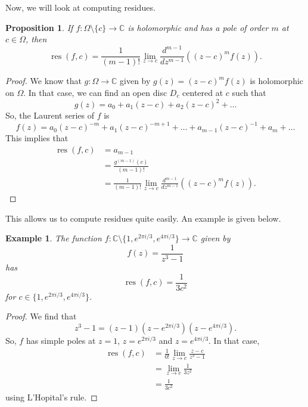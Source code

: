 \documentclass[a4paper, openany]{memoir}
\theoremstyle{definition}
\theoremstyle{plain}
\newtheorem{proposition}[definition]{Proposition}
\newtheorem{example}[definition]{Example}
\begin{document}
Now, we will look at computing residues.
\begin{proposition}
    If $f: \Omega \setminus \{c\} \to \mathbb{C}$ is holomorphic and has a pole of order $m$ at $c \in \Omega$, then
    \[\operatorname{res}(f, c) = \frac{1}{(m-1)!} \lim_{z \to c} \frac{d^{m-1}}{dz^{m-1}} \left((z - c)^m f(z)\right).\]
\end{proposition}
\begin{proof}
    We know that $g: \Omega \to \mathbb{C}$ given by $g(z) = (z - c)^m f(z)$ is holomorphic on $\Omega$. In that case, we can find an open disc $D_c$ centered at $c$ such that
    \[g(z) = a_0 + a_1 (z - c) + a_2 (z - c)^2 + \dots\]
    So, the Laurent series of $f$ is
    \[f(z) = a_0 (z - c)^{-m} + a_1 (z - c)^{-m + 1} + \dots + a_{m-1} (z - c)^{-1} + a_m + \dots\]
    This implies that
    \begin{align*}
        \operatorname{res}(f, c) &= a_{m-1} \\
        &= \frac{g^{(m-1)}(c)}{(m-1)!} \\ %
        &= \frac{1}{(m-1)!} \lim_{z \to c} \frac{d^{m-1}}{dz^{m-1}} \left((z - c)^m f(z) \right). %
    \end{align*}
\end{proof}
\noindent This allows us to compute residues quite easily. An example is given below.
\begin{example}
    The function $f: \mathbb{C} \setminus \{1, e^{2\pi i/3}, e^{4\pi i/3}\} \to \mathbb{C}$ given by
    \[f(z) = \frac{1}{z^3 - 1}\]
    has 
    \[\operatorname{res}(f, c) = \frac{1}{3c^2}\]
    for $c \in \{1, e^{2\pi i/3}, e^{4\pi i/3}\}$.
\end{example}
\begin{proof}
    We find that
    \[z^3 - 1 = (z - 1) (z - e^{2\pi i/3}) (z - e^{4\pi i/3}).\]
    So, $f$ has simple poles at $z = 1$, $z = e^{2\pi i/3}$ and $z = e^{4\pi i/3}$. In that case,
    \begin{align*}
        \operatorname{res}(f, c) &= \frac{1}{0!} \lim_{z \to c} \frac{z - c}{z^3 - 1} \\
        &= \lim_{z \to c} \frac{1}{3z^2} \\
        &= \frac{1}{3c^2}
    \end{align*}
    using L'Hopital's rule.
\end{proof}


\end{document}
